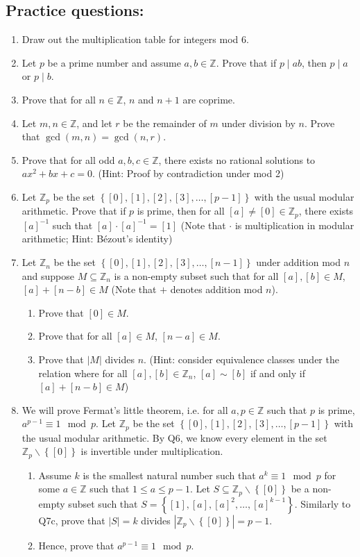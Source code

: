 \documentclass[letterpaper,12pt]{article}
\newcommand{\set}[1]{\left\{ #1 \right\}}
\begin{document}
\subsection*{Practice questions:}
\begin{enumerate}
\item Draw out the multiplication table for integers mod $6$.
\item Let $p$ be a prime number and assume $a,b \in \mathbb{Z}$. Prove that if $p \mid ab$, then $p \mid a$ or $p \mid b$.
\item Prove that for all $n \in \mathbb{Z}$, $n$ and $n+1$ are coprime.
\item Let $m,n \in \mathbb{Z}$, and let $r$ be the remainder of $m$ under division by $n$. Prove that $\gcd (m,n) = \gcd (n,r)$.
    \item Prove that for all odd $a,b,c \in \mathbb{Z}$, there exists no rational solutions to $ax^2 + bx + c = 0$. (Hint: Proof by contradiction under mod 2)
    \item Let $\mathbb{Z}_p$ be the set $\set{[0],[1],[2],[3],\ldots,[p-1]}$ with the usual modular arithmetic. Prove that if $p$ is prime, then for all $[a] \neq [0] \in \mathbb{Z}_p$, there exists $[a]^{-1}$ such that $[a] \cdot [a]^{-1} = [1]$ (Note that $\cdot$ is multiplication in modular arithmetic; Hint: Bézout's identity)
    \item Let $\mathbb{Z}_n$ be the set $\set{[0],[1],[2],[3],\ldots,[n-1]}$ under addition mod $n$ and suppose $M \subseteq \mathbb{Z}_n$ is a non-empty subset such that for all $[a],[b] \in M$, $[a] + [n-b] \in M$ (Note that $+$ denotes addition mod $n$). \begin{enumerate}
        \item Prove that $[0] \in M$.
        \item Prove that for all $[a] \in M$, $[n-a] \in M$.
        \item Prove that $|M|$ divides $n$. (Hint: consider equivalence classes under the relation where for all $[a], [b] \in \mathbb{Z}_n$, $[a] \sim [b]$ if and only if $[a] + [n-b] \in M$)
    \end{enumerate}
    \item We will prove Fermat's little theorem, i.e. for all $a ,p \in \mathbb{Z}$ such that $p$ is prime, $a^{p-1} \equiv 1 \mod p$. Let $\mathbb{Z}_p$ be the set $\set{[0],[1],[2],[3],\ldots,[p-1]}$ with the usual modular arithmetic. By Q6, we know every element in the set $\mathbb{Z}_p \backslash \set{[0]}$ is invertible under multiplication. \begin{enumerate}
        \item Assume $k$ is the smallest natural number such that $a^k \equiv 1 \mod p$ for some $a \in \mathbb{Z}$ such that $1 \leq a \leq p-1$. Let $S \subseteq \mathbb{Z}_p \backslash \set{[0]}$ be a non-empty subset such that $S = \set{[1],[a],[a]^2, \ldots, [a]^{k-1}}$. Similarly to Q7c, prove that $|S| = k$ divides $|\mathbb{Z}_p \backslash \set{[0]}| = p-1$.
        \item Hence, prove that $a^{p-1} \equiv 1 \mod p$.
    \end{enumerate}
\end{enumerate}
\end{document}
